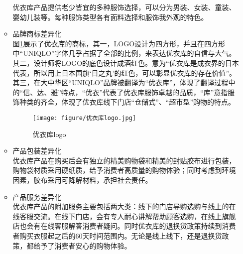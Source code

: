 \documentclass{xjtureport}
\begin{document}
\begin{enumerate}
\begin{itemize}
        优衣库产品提供老少皆宜的多种服饰选择，可以分为男装、女装、童装、婴幼儿装等。每种服饰类型各有面料选择和服饰我外观的特色。
        \item 品牌商标差异化\\
        图\ref{优衣库商标}展示了优衣库的商标，其一，LOGO设计为四方形，并且在四方形中“UNIQLO”字体几乎占据了全部的比例，来表达优衣库的自信与大气。其二，设计师将LOGO的底色设计成酒红色。意为“优衣库是成衣界的日本代表，所以用上日本国旗‘日之丸’的红色，可以彰显优衣库的存在价值”。其三，在大中华区“UNIQLO”品牌被翻译为“优衣库”，体现了翻译过程中的“信、达、雅”特点，“优衣”代表了优衣库服饰卓越的品质，“库”意指服饰种类的齐全，体现了优衣库线下门店“仓储式”、“超市型”购物的特点。
        \begin{figure}[H]
                    \label{优衣库商标}
                    \centering
                    \texttt{[image: figure/优衣库logo.jpg]}
                    \caption{优衣库logo}
        \end{figure}
        \item 产品包装差异化\\
        优衣库产品在购买后会有独立的精美购物袋和精美的封贴胶布进行包装，购物袋材质采用硬纸质，给予消费者高质量的购物体验；同时考虑到环境因素，胶布采用可降解材料，承担社会责任。
        \item 产品服务差异化\\
        优衣库产品的附加服务主要包括两大类：线下的门店导购选购与线上的在线客服交流。在线下门店，会有专人耐心讲解帮助顾客选购，在线上旗舰店也会有在线客服解答消费者疑问。同时优衣库的退换货政策持续到消费者购买衣服起之后的60天时间范围内\cite{ref8}。无论是线上线下，还是退换货政策，都给予了消费者安心的购物体验。
    \end{itemize}
\end{enumerate}
\end{document}
